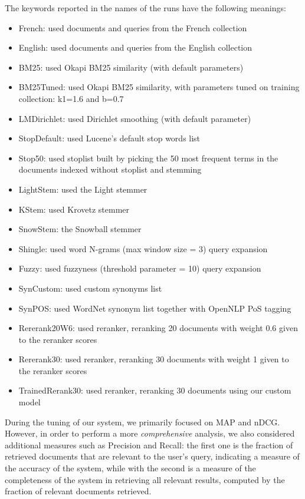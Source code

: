 The keywords reported in the names of the runs have the following meanings:
\begin{itemize}
	\item French: used documents and queries from the French collection
	\item English: used documents and queries from the English collection
	\item BM25: used Okapi BM25 similarity (with default parameters)
	\item BM25Tuned: used Okapi BM25 similarity, with parameters tuned on training collection: k1=1.6 and b=0.7
	\item LMDirichlet: used Dirichlet smoothing (with default parameter)
	\item StopDefault: used Lucene's default stop words list
	\item Stop50: used stoplist built by picking the 50 most frequent terms in the documents indexed without stoplist and stemming
	\item LightStem: used the Light stemmer
	\item KStem: used Krovetz stemmer
	\item SnowStem: the Snowball stemmer
	\item Shingle: used word N-grams (max window size = 3) query expansion
	\item Fuzzy: used fuzzyness (threshold parameter = 10) query expansion
	\item SynCustom: used custom synonyms list
	\item SynPOS: used WordNet synonym list together with OpenNLP \ac{PoS} tagging
	\item Rererank20W6: used reranker, reranking 20 documents with weight 0.6 given to the reranker scores
	\item Rererank30: used reranker, reranking 30 documents with weight 1 given to the reranker scores
	\item TrainedRerank30: used reranker, reranking 30 documents using our custom model
\end{itemize}

During the tuning of our system, we primarily focused on \ac{MAP} and \ac{nDCG}. However, in order to perform a more \emph{comprehensive} analysis, 
we also considered additional measures such as Precision and Recall: the first one is the fraction of retrieved 
documents that are relevant to the user's query, indicating a measure of the accuracy of the system,
while with the second is a measure of the completeness of the system in retrieving all relevant results, 
computed by the fraction of relevant documents retrieved.

